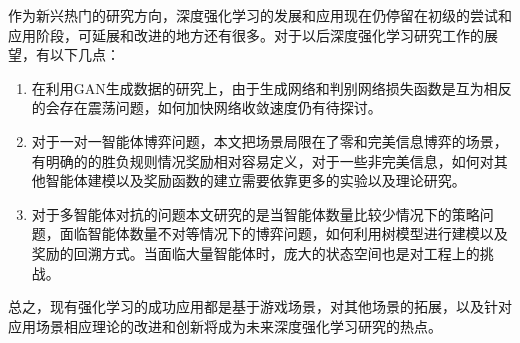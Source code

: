 作为新兴热门的研究方向，深度强化学习的发展和应用现在仍停留在初级的尝试和应用阶段，可延展和改进的地方还有很多。对于以后深度强化学习研究工作的展望，有以下几点：
\begin{enumerate}
	\item 在利用GAN生成数据的研究上，由于生成网络和判别网络损失函数是互为相反的会存在震荡问题，如何加快网络收敛速度仍有待探讨。
	\item 对于一对一智能体博弈问题，本文把场景局限在了零和完美信息博弈的场景，有明确的的胜负规则情况奖励相对容易定义，对于一些非完美信息，如何对其他智能体建模以及奖励函数的建立需要依靠更多的实验以及理论研究。
	\item 对于多智能体对抗的问题本文研究的是当智能体数量比较少情况下的策略问题，面临智能体数量不对等情况下的博弈问题，如何利用树模型进行建模以及奖励的回溯方式。当面临大量智能体时，庞大的状态空间也是对工程上的挑战。
\end{enumerate}

总之，现有强化学习的成功应用都是基于游戏场景，对其他场景的拓展，以及针对应用场景相应理论的改进和创新将成为未来深度强化学习研究的热点。